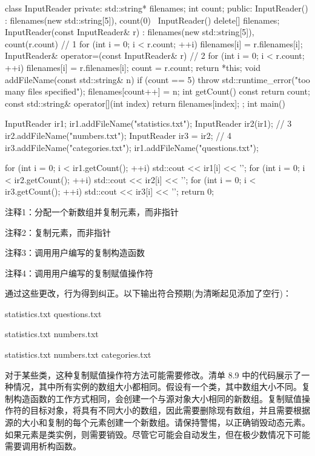 \begin{cpp}
class InputReader {
private:
  std::string* filenames;
  int count;
public:
  InputReader() : filenames(new std::string[5]), count(0) {}
  ~InputReader() { delete[] filenames; }
  InputReader(const InputReader& r) : filenames(new std::string[5]),
      count(r.count) { // 1
    for (int i = 0; i < r.count; ++i)
      filenames[i] = r.filenames[i];
  }
  InputReader& operator=(const InputReader& r) { // 2
    for (int i = 0; i < r.count; ++i)
      filenames[i] = r.filenames[i];
    count = r.count;
    return *this;
  }
  void addFileName(const std::string& n) {
    if (count == 5)
      throw std::runtime_error("too many files specified");
    filenames[count++] = n;
  }
  int getCount() const { return count; }
  const std::string& operator[](int index) {
  return filenames[index];
}
};
int main() {
  InputReader ir1;
  ir1.addFileName("statistics.txt");
  InputReader ir2(ir1); // 3
  ir2.addFileName("numbers.txt");
  InputReader ir3 = ir2; // 4
  ir3.addFileName("categories.txt");
  ir1.addFileName("questions.txt");

  for (int i = 0; i < ir1.getCount(); ++i)
    std::cout << ir1[i] << '\n';
  for (int i = 0; i < ir2.getCount(); ++i)
    std::cout << ir2[i] << '\n';
  for (int i = 0; i < ir3.getCount(); ++i)
    std::cout << ir3[i] << '\n';
  return 0;
}
\end{cpp}

{\footnotesize
注释1：分配一个新数组并复制元素，而非指针

注释2：复制元素，而非指针

注释3：调用用户编写的复制构造函数

注释4：调用用户编写的复制赋值操作符
}

通过这些更改，行为得到纠正。以下输出符合预期(为清晰起见添加了空行)：

\begin{shell}
statistics.txt
questions.txt

statistics.txt
numbers.txt

statistics.txt
numbers.txt
categories.txt
\end{shell}

对于某些类，这种复制赋值操作符方法可能需要修改。清单 8.9 中的代码展示了一种情况，其中所有实例的数组大小都相同。假设有一个类，其中数组大小不同。复制构造函数的工作方式相同，会创建一个与源对象大小相同的新数组。复制赋值操作符的目标对象，将具有不同大小的数组，因此需要删除现有数组，并且需要根据源的大小和复制的每个元素创建一个新数组。请保持警惕，以正确销毁动态元素。如果元素是类实例，则需要销毁。尽管它可能会自动发生，但在极少数情况下可能需要调用析构函数。

